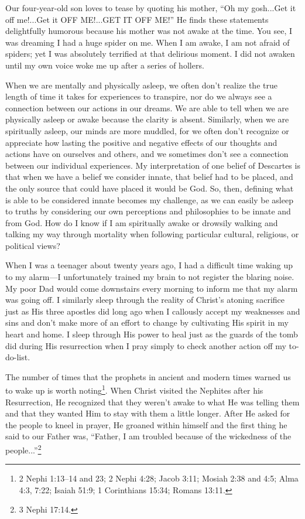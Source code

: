 			Our four-year-old son loves to tease by quoting his mother, ``Oh my gosh...Get it off me!...Get it OFF ME!...GET IT OFF ME!'' He finds these statements delightfully humorous because his mother was not awake at the time. You see, I was dreaming I had a huge spider on me. When I am awake, I am not afraid of spiders; yet I was absolutely terrified at that delirious moment. I did not awaken until my own voice woke me up after a series of hollers.

			When we are mentally and physically asleep, we often don't realize the true length of time it takes for experiences to transpire, nor do we always see a connection between our actions in our dreams. We are able to tell when we are physically asleep or awake because the clarity is absent. Similarly, when we are spiritually asleep, our minds are more muddled, for we often don't recognize or appreciate how lasting the positive and negative effects of our thoughts and actions have on ourselves and others, and we sometimes don't see a connection between our individual experiences. My interpretation of one belief of Descartes is that when we have a belief we consider innate, that belief had to be placed, and the only source that could have placed it would be God. So, then, defining what is able to be considered innate becomes my challenge, as we can easily be asleep to truths by considering our own perceptions and philosophies to be innate and from God. How do I know if I am spiritually awake or drowsily walking and talking my way through mortality when following particular cultural, religious, or political views?

			When I was a teenager about twenty years ago, I had a difficult time waking up to my alarm---I unfortunately trained my brain to not register the blaring noise. My poor Dad would come downstairs every morning to inform me that my alarm was going off. I similarly sleep through the reality of Christ's atoning sacrifice just as His three apostles did long ago when I callously accept my weaknesses and sins and don't make more of an effort to change by cultivating His spirit in my heart and home. I sleep through His power to heal just as the guards of the tomb did during His resurrection when I pray simply to check another action off my to-do-list.

			The number of times that the prophets in ancient and modern times warned us to wake up is worth noting\footnote{2 Nephi 1:13--14 and 23; 2 Nephi 4:28; Jacob 3:11; Mosiah 2:38 and 4:5; Alma 4:3, 7:22; Isaiah 51:9; 1 Corinthians 15:34; Romans 13:11.}. When Christ visited the Nephites after his Resurrection, He recognized that they weren't awake to what He was telling them and that they wanted Him to stay with them a little longer. After He asked for the people to kneel in prayer, He groaned within himself and the first thing he said to our Father was, ``Father, I am troubled because of the wickedness of the people...''\footnote{3 Nephi 17:14.}

